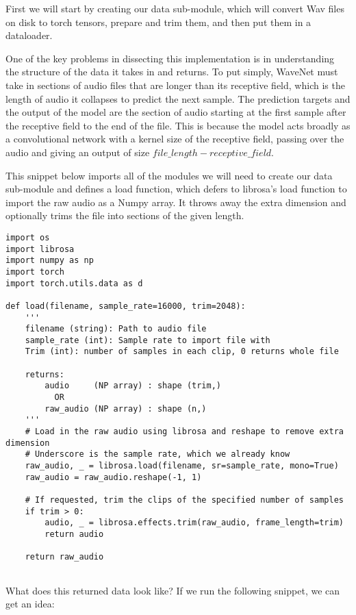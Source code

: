 First we will start by creating our data sub-module, which will convert Wav files on disk to torch tensors, prepare and trim them, and then put them in a dataloader. 

One of the key problems in dissecting this implementation  is in understanding the structure of the data it takes in and returns. To put simply, WaveNet must take in sections of audio files that are longer than its receptive field, which is the length of audio it collapses to predict the next sample. The prediction targets and the output of the model are the section of audio starting at the first sample after the receptive field to the end of the file. This is because the model acts broadly as a convolutional network with a kernel size of the receptive field, passing over the audio and giving an output of size $file\_length - receptive\_field$.

This snippet below imports all of the modules we will need to create our data sub-module and defines a load function, which defers to librosa's load function to import the raw audio as a Numpy array. It throws away the extra dimension and optionally trims the file into sections of the given length. 

\newpage


\begin{verbatim}
import os
import librosa
import numpy as np
import torch
import torch.utils.data as d

def load(filename, sample_rate=16000, trim=2048):
    '''
    filename (string): Path to audio file
    sample_rate (int): Sample rate to import file with
    Trim (int): number of samples in each clip, 0 returns whole file

    returns:
        audio     (NP array) : shape (trim,)
          OR
        raw_audio (NP array) : shape (n,)
    '''
    # Load in the raw audio using librosa and reshape to remove extra dimension
    # Underscore is the sample rate, which we already know
    raw_audio, _ = librosa.load(filename, sr=sample_rate, mono=True)
    raw_audio = raw_audio.reshape(-1, 1)

    # If requested, trim the clips of the specified number of samples
    if trim > 0:
        audio, _ = librosa.effects.trim(raw_audio, frame_length=trim)
        return audio

    return raw_audio
    
\end{verbatim}

What does this returned data look like? If we run the following snippet, we can get an idea:

